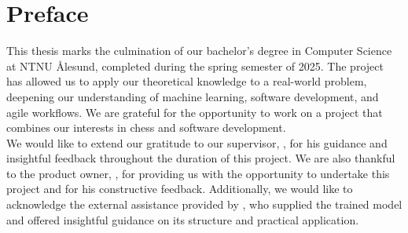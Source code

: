 \chapter*{Preface}

This thesis marks the culmination of our bachelor's degree in Computer Science at NTNU Ålesund, completed during the spring semester of 2025. The project has allowed us to apply our theoretical knowledge to a real-world problem, deepening our understanding of machine learning, software development, and agile workflows. We are grateful for the opportunity to work on a project that combines our interests in chess and software development. \\

We would like to extend our gratitude to our supervisor, \textbf{\saleh}, for his guidance and insightful feedback throughout the duration of this project. We are also thankful to the product owner, \textbf{\arne}, for providing us with the opportunity to undertake this project and for his constructive feedback. Additionally, we would like to acknowledge the external assistance provided by \textbf{\peter}, who supplied the trained model and offered insightful guidance on its structure and practical application.